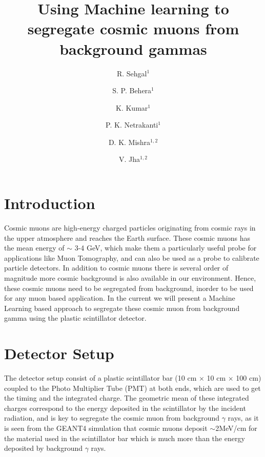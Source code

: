 \documentclass[twocolumn,amsmath,amssymb]{snp}
\begin{document}
\title{{\Large Using Machine learning to segregate cosmic muons from background gammas}}%

\author{\large R. Sehgal$^1$}
\author{\large S. P. Behera$^1$}
\author{\large K. Kumar$^1$}
\author{\large P. K. Netrakanti$^1$}
\author{\large D. K. Mishra$^{1,2}$}
\author{\large V. Jha$^{1,2}$}

\maketitle


\section*{Introduction}
Cosmic muons are high-energy charged particles originating from cosmic rays in the upper atmosphere and reaches the Earth surface. These cosmic muons has the mean energy of $\sim$ 3-4 GeV, which make them a particularly useful probe for applications like Muon Tomography, and can also be used as a probe to calibrate particle detectors. In addition to cosmic muons there is several order of magnitude more cosmic background is also available in our environment. Hence, these cosmic muons need to be segregated from background, inorder to be used for any muon based application. In the current we will present a Machine Learning based approach to segregate these cosmic muon from background gamma using the plastic scintillator detector.

\section*{Detector Setup}
The detector setup consist of a plastic scintillator bar (10 cm $\times$ 10 cm $\times$ 100 cm) coupled to the Photo Multiplier Tube (PMT) at both ends, which are used to get the timing and the integrated charge. The geometric mean of these integrated charges correspond to the energy deposited in the scintillator by the incident radiation, and is key to segregate the cosmic muon from background $\gamma$ rays, as it is seen from the GEANT4 \cite{geant} simulation that cosmic muons deposit $\sim$2MeV/cm for the material used in the scintillator bar which is much more than the energy deposited by background $\gamma$ rays.
\end{document}
